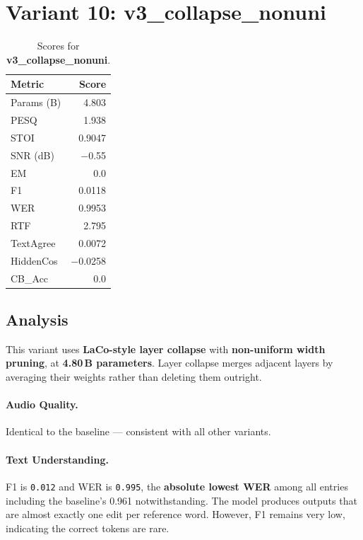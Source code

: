 \documentclass[11pt,a4paper]{article}
\newcommand{\scoreval}[1]{\texttt{#1}}
\begin{document}
\section{Variant 10: v3\_collapse\_nonuni}

\begin{table}[H]
\centering
\caption{Scores for \textbf{v3\_collapse\_nonuni}.}
\begin{tabular}{l r}
\toprule
\textbf{Metric} & \textbf{Score} \\
\midrule
Params (B)    & 4.803 \\
PESQ          & 1.938 \\
STOI          & 0.9047 \\
SNR (dB)      & $-$0.55 \\
EM            & 0.0 \\
F1            & 0.0118 \\
WER           & 0.9953 \\
RTF           & 2.795 \\
TextAgree     & 0.0072 \\
HiddenCos     & $-$0.0258 \\
CB\_Acc       & 0.0 \\
\bottomrule
\end{tabular}
\end{table}

\subsection{Analysis}

This variant uses \textbf{LaCo-style layer collapse} with \textbf{non-uniform width pruning}, at \textbf{4.80\,B parameters}. Layer collapse merges adjacent layers by averaging their weights rather than deleting them outright.

\paragraph{Audio Quality.}
Identical to the baseline — consistent with all other variants.

\paragraph{Text Understanding.}
F1 is \scoreval{0.012} and WER is \scoreval{0.995}, the \textbf{absolute lowest WER} among all entries including the baseline's 0.961 notwithstanding. The model produces outputs that are almost exactly one edit per reference word. However, F1 remains very low, indicating the correct tokens are rare.
\end{document}
